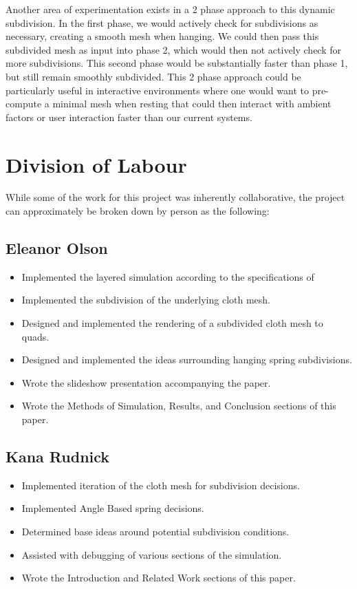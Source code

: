 \documentclass[sigconf]{acmart}
\begin{document}
Another area of experimentation exists in a 2 phase approach to this dynamic subdivision. In the first phase, we would actively check for subdivisions as necessary, creating a smooth mesh when hanging. We could then pass this subdivided mesh as input into phase 2, which would then not actively check for more subdivisions. This second phase would be substantially faster than phase 1, but still remain smoothly subdivided. This 2 phase approach could be particularly useful in interactive environments where one would want to pre-compute a minimal mesh when resting that could then interact with ambient factors or user interaction faster than our current systems.
\section{Division of Labour}
While some of the work for this project was inherently collaborative, the project can approximately be broken down by person as the following:
\subsection*{Eleanor Olson}
\begin{itemize}
    \item Implemented the layered simulation according to the specifications of \cite{hutchinson}
    \item Implemented the subdivision of the underlying cloth mesh.
    \item Designed and implemented the rendering of a subdivided cloth mesh to quads.
    \item Designed and implemented the ideas surrounding hanging spring subdivisions.
    \item Wrote the slideshow presentation accompanying the paper.
    \item Wrote the Methods of Simulation, Results, and Conclusion sections of this paper.
\end{itemize}
\subsection*{Kana Rudnick}
\begin{itemize}
    \item Implemented iteration of the cloth mesh for subdivision decisions.
    \item Implemented Angle Based spring decisions.
    \item Determined base ideas around potential subdivision conditions.
    \item Assisted with debugging of various sections of the simulation.
    \item Wrote the Introduction and Related Work sections of this paper.
\end{itemize}
\end{document}
